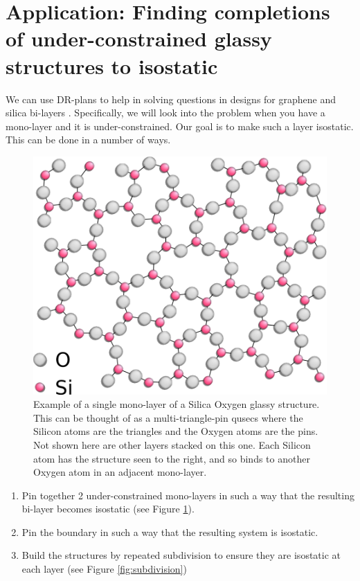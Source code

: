 \section{Application: Finding completions of under-constrained glassy structures to isostatic}
\label{sec:bodypin}

We can use DR-plans to help in solving questions in designs for graphene and silica bi-layers \uncited. Specifically, we will look into the problem when you have a mono-layer and it is under-constrained. Our goal is to make such a layer isostatic. This can be done in a number of ways.

\begin{figure}\centering
    \includegraphics[width=0.4\linewidth]{img/Silica} \hspace{0.5cm}
    \caption{Example of a single mono-layer of a Silica Oxygen glassy structure. This can be thought of as a multi-triangle-pin qusecs where the Silicon atoms are the triangles and the Oxygen atoms are the pins. Not shown here are other layers stacked on this one. Each Silicon atom has the structure seen to the right, and so binds to another Oxygen atom in an adjacent mono-layer.}
    \label{fig:silica_glass}
\end{figure}

\begin{enumerate}
    \item Pin together 2 under-constrained mono-layers in such a way that the resulting bi-layer becomes isostatic (see Figure \ref{fig:silica_glass}).
    \item Pin the boundary in such a way that the resulting system is isostatic.
    \item Build the structures by repeated subdivision to ensure they are isostatic at each layer (see Figure \ref{fig:subdivision})
\end{enumerate}

